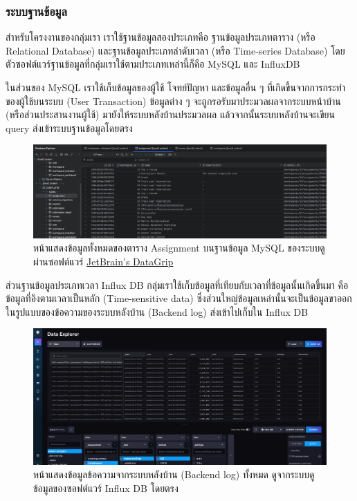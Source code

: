 \documentclass[12pt,one side,openright,a4paper]{cpe-thesis-th}
\newcommand{\thaijustify}[1]{%
  \par\hspace{30pt}\justifying
  #1
}
\begin{document}
        \subsubsection{ระบบฐานข้อมูล}
            \thaijustify{
                สำหรับโครงงานของกลุ่มเรา เราใช้ฐานข้อมูลสองประเภทคือ ฐานข้อมูลประเภทตาราง (หรือ Relational Database) และฐานข้อมูลประเภทลำดับเวลา (หรือ Time-series Database) โดยตัวซอฟต์แวร์ฐานข้อมูลที่กลุ่มเราใช้ตามประเภทเหล่านี้ก็คือ MySQL และ InfluxDB
            }
            \thaijustify{
                ในส่วนของ MySQL เราใช้เก็บข้อมูลของผู้ใช้ โจทย์ปัญหา และข้อมูลอื่น ๆ ที่เกิดขึ้นจากการกระทำของผู้ใช้บนระบบ (User Transaction) ข้อมูลต่าง ๆ จะถูกรอรับมาประมวลผลจากระบบหน้าบ้าน (หรือส่วนประสานงานผู้ใช้) มายังให้ระบบหลังบ้านประมวลผล แล้วจากนั้นระบบหลังบ้านจะเขียน query ส่งเข้าระบบฐานข้อมูลโดยตรง
            }
            \begin{figure}[H]
                \centering
                \includegraphics[width=12cm]{figure/results/datagrip.png}
                \caption[ระบบฐานข้อมูล MySQL ดูผ่าน DataGrip]{หน้าแสดงข้อมูลทั้งหมดของตาราง Assignment บนฐานข้อมูล MySQL ของระบบดูผ่านซอฟต์แวร์ \href{https://www.jetbrains.com/datagrip}{JetBrain's DataGrip}}
                \label{fig:res-datagrip}
            \end{figure}
            \thaijustify{
                ส่วนฐานข้อมูลประเภทเวลา Influx DB กลุ่มเราใช้เก็บข้อมูลที่เทียบกับเวลาที่ข้อมูลนั้นเกิดขึ้นมา คือข้อมูลที่อิงตามเวลาเป็นหลัก (Time-sensitive data) ซึ่งส่วนใหญ่ข้อมูลเหล่านั้นจะเป็นข้อมูลขาออกในรูปแบบของข้อความของระบบหลังบ้าน (Backend log) ส่งเข้าไปเก็บใน Influx DB
            }
            \begin{figure}[H]
                \centering
                \includegraphics[width=12cm]{figure/results/influx.png}
                \caption[ระบบฐานข้อมูล Influx DB]{หน้าแสดงข้อมูลข้อความจากระบบหลังบ้าน (Backend log) ทั้งหมด ดูจากระบบดูข้อมูลของซอฟต์แวร์ Influx DB โดยตรง}
                \label{fig:res-influx}
            \end{figure}
\end{document}
